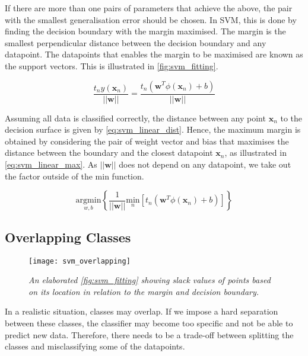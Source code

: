 If there are more than one pairs of parameters that achieve the above, the pair with the smallest generalisation error should be chosen. In SVM, this is done by finding the decision boundary with the margin maximised. The margin is the smallest perpendicular distance between the decision boundary and any datapoint. The datapoints that enables the margin to be maximised are known as the support vectors. This is illustrated in \autoref{fig:svm_fitting}.

\begin{equation} \label{eq:svm_linear_dist}
  \frac{t_n y(\mathbf{x}_n)}{||\mathbf{w}||} = \frac{t_n (\mathbf{w}^T \phi(\mathbf{x}_n) + b)}{||\mathbf{w}||}
\end{equation}

Assuming all data is classified correctly, the distance between any point $\mathbf{x}_n$ to the decision surface is given by \autoref{eq:svm_linear_dist}. Hence, the maximum margin is obtained by considering the pair of weight vector and bias that maximises the distance between the boundary and the closest datapoint $\mathbf{x}_n$, as illustrated in \autoref{eq:svm_linear_max}. As $||\mathbf{w}||$ does not depend on any datapoint, we take out the factor outside of the $\mathrm{min}$ function. 

\begin{equation} \label{eq:svm_linear_max}
  \underset{w,b}{\mathrm{argmin}} \left \{ \frac{1}{||\mathbf{w}||} \underset{n}{\mathrm{min}} \left [ t_n \left (\mathbf{w}^T \phi \left (\mathbf{x}_n \right) + b \right) \right ] \right \} 
\end{equation}

\subsection{Overlapping Classes}

\begin{figure}[H]
  \centering
  \texttt{[image: svm\_overlapping]}
  \caption{\textit{An elaborated \autoref{fig:svm_fitting} showing slack values of points based on its location in relation to the margin and decision boundary.}}
  \label{fig:svm_overlapping}
\end{figure}
In a realistic situation, classes may overlap. If we impose a hard separation between these classes, the classifier may become too specific and not be able to predict new data. Therefore, there needs to be a trade-off between splitting the classes and misclassifying some of the datapoints. 

